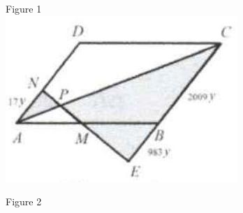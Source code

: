 \documentclass{article}
\begin{document}
Figure 1\\
\centering
\includegraphics[width=\textwidth]{images/142(4).jpg}

Figure 2
\end{document}

